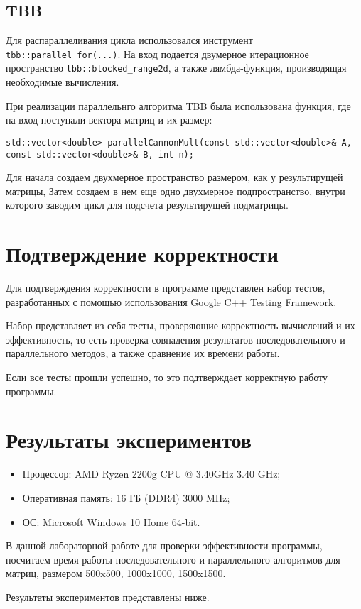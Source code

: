 \documentclass{report}
\begin{document}
\subsection*{TBB}
\par Для распараллеливания цикла использовался инструмент \verb|tbb::parallel_for(...)|. На вход подается двумерное итерационное пространство \verb|tbb::blocked_range2d|, а также лямбда-функция, производящая необходимые вычисления.
\par При реализации параллельнго алгоритма TBB была использована функция, где на вход поступали вектора матриц и их размер:
\begin{lstlisting}
std::vector<double> parallelCannonMult(const std::vector<double>& A, const std::vector<double>& B, int n);
\end{lstlisting}
\par Для начала создаем двухмерное пространство размером, как у результирущей матрицы, Затем создаем в нем еще одно двухмерное подпространство, внутри которого заводим цикл для подсчета результирущей подматрицы.
\newpage

\section*{Подтверждение корректности}
Для подтверждения корректности в программе представлен набор тестов, разработанных с помощью использования Google C++ Testing Framework.
\par Набор представляет из себя тесты, проверяющие корректность вычислений и их эффективность, то есть проверка совпадения результатов последовательного и параллельного методов, а также сравнение их времени работы.
\par Если все тесты прошли успешно, то это подтверждает корректную работу программы.
\newpage

\section*{Результаты экспериментов}
\begin{itemize}
\item Процессор: AMD Ryzen 2200g CPU @ 3.40GHz   3.40 GHz;
\item Оперативная память: 16 ГБ (DDR4) 3000 MHz;
\item ОС: Microsoft Windows 10 Home 64-bit.
\end{itemize}
\par В данной лабораторной работе для проверки эффективности программы, посчитаем время работы последовательного и параллельного алгоритмов для матриц, размером 500x500, 1000x1000, 1500x1500.
\par Результаты экспериментов представлены ниже.
\end{document}
